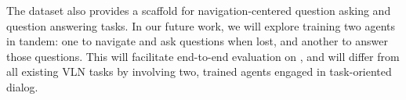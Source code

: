 The \dataset{} dataset also provides a scaffold for navigation-centered question asking and question answering tasks.
In our future work, we will explore training two agents in tandem: one to navigate and ask questions when lost, and another to answer those questions.
This will facilitate end-to-end evaluation on \dataset{}, and will differ from all existing VLN tasks by involving two, trained agents engaged in task-oriented dialog.
